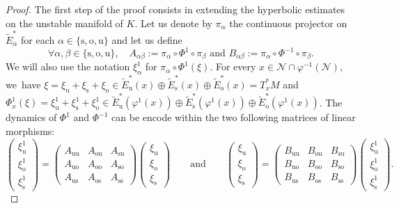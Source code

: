 \documentclass[JEP,XML,SOM,Unicode,NoEqCountersInSection,NoFloatCountersInSection,published]{cedram}
\newcommand{\ro}{\mathrm{o}}
\newcommand{\rs}{\mathrm{s}}
\newcommand{\rso}{\mathrm{so}}
\newcommand{\ru}{\mathrm{u}}
\newcommand{\ruo}{\mathrm{uo}}
\theoremstyle{definition}
\theoremstyle{plain}
\newcommand{\Ncal}{\mathcal{N}}
\begin{document}
\begin{proof}
The first step of the proof consists in extending the hyperbolic estimates on the unstable manifold of $K$. Let us denote by $\pi_{\alpha}$ the continuous projector on $\widetilde{E}_{\alpha}^*$ for each $\alpha \in \{\rs,\ro,\ru\}$ and let us define
\[
\forall \alpha, \beta \in \{\rs,\ro,\ru\}, \quad A_{\alpha \beta}:= \pi_{\alpha} \circ \Phi^1 \circ \pi_{\beta} \text{ and } B_{\alpha \beta}:= \pi_{\alpha} \circ \Phi^{-1} \circ \pi_{\beta}.
\]
We will also use the notation $\xi_{\alpha}^1$ for $\pi_{\alpha} \circ \Phi^1 (\xi)$. For every $x \in \Ncal \cap \varphi^{-1}(\Ncal) $, we~have $\xi = \xi_\ru + \xi_\rs + \xi_\ro \in \widetilde{E}_\ru^* (x) \oplus \widetilde{E}_\rs^* (x) \oplus \widetilde{E}_\ro^* (x) = T_x^* M$ and $\Phi_x^1 (\xi) = \xi_\ru^1 + \xi_\rs^1 + \xi_\ro^1 \in \widetilde{E}_\ru^* (\varphi^1 (x)) \oplus \widetilde{E}_\rs^* (\varphi^1 (x)) \oplus \widetilde{E}_\ro^* (\varphi^1 (x))$. The dynamics of $\Phi^1$ and $\Phi^{-1}$ can be encode within the two following matrices of linear morphisms:
\[
\begin{pmatrix}\xi_\ru^1 \\ \xi_\ro^1 \\ \xi_\rs^1 \end{pmatrix}
= \begin{pmatrix}
A_{\ru\ru} & A_{\ro\ru} & A_{\rs\ru} \\
A_{\ruo} & A_{\ro\ro} & A_{\rso} \\
A_{\ru\rs} & A_{\ro\rs} & A_{\rs\rs}
\end{pmatrix}
\begin{pmatrix}\xi_\ru \\ \xi_\ro \\ \xi_\rs \end{pmatrix}
\qquad \text{and} \qquad \begin{pmatrix}\xi_\ru \\ \xi_\ro \\ \xi_\rs \end{pmatrix}
= \begin{pmatrix}
B_{\ru\ru} & B_{\ro\ru} & B_{\rs\ru} \\
B_{\ruo} & B_{\ro\ro} & B_{\rso} \\
B_{\ru\rs} & B_{\ro\rs} & B_{\rs\rs}
\end{pmatrix}
\begin{pmatrix}\xi_\ru^1 \\ \xi_\ro^1 \\ \xi_\rs^1 \end{pmatrix}.
\]
\end{proof}
\end{document}
